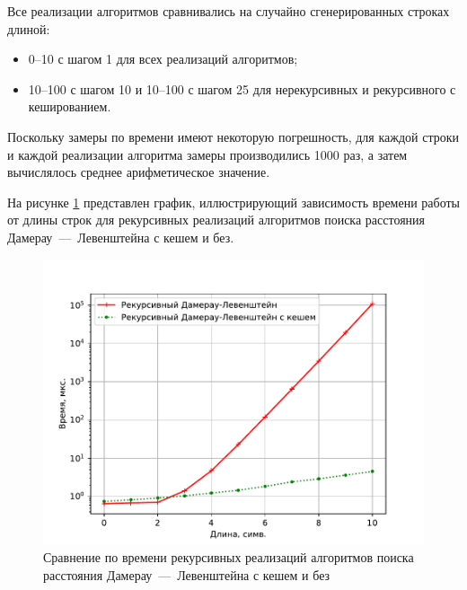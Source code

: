 Все реализации алгоритмов сравнивались на случайно сгенерированных строках длиной:
\begin{itemize}
	\item 0--10 с шагом 1 для всех реализаций алгоритмов;
	\item 10--100 с шагом 10 и 10--100 с шагом 25 для нерекурсивных и рекурсивного с кешированием. 
\end{itemize}

Поскольку замеры по времени имеют некоторую погрешность, для каждой строки и каждой реализации алгоритма замеры производились 1000 раз, а затем вычислялось среднее арифметическое значение.

На рисунке \ref{plt:time_01} представлен график, иллюстрирующий зависимость времени работы от длины строк для рекурсивных реализаций алгоритмов поиска расстояния Дамерау~---~Левенштейна с кешем и без.
\begin{figure}[H]
	\centering
	\includegraphics[height=0.5\textheight, page=1]{img/figures.pdf}
	\caption{Сравнение по времени рекурсивных реализаций алгоритмов поиска расстояния Дамерау~---~Левенштейна с кешем и без}
	\label{plt:time_01}
\end{figure}

